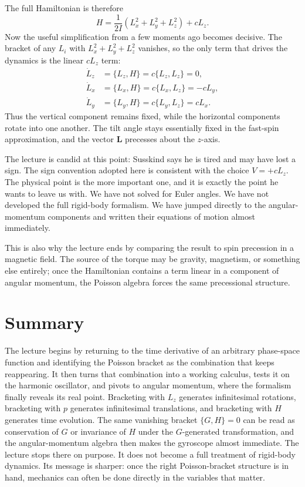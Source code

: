 The full Hamiltonian is therefore
\begin{equation}
H=\frac{1}{2I}\left(L_x^2+L_y^2+L_z^2\right)+cL_z.
\end{equation}
Now the useful simplification from a few moments ago becomes decisive. The bracket of any \(L_i\) with \(L_x^2+L_y^2+L_z^2\) vanishes, so the only term that drives the dynamics is the linear \(cL_z\) term:
\begin{align}
\dot L_z&=\{L_z,H\}=c\{L_z,L_z\}=0,\\
\dot L_x&=\{L_x,H\}=c\{L_x,L_z\}=-cL_y,\\
\dot L_y&=\{L_y,H\}=c\{L_y,L_z\}=cL_x.
\end{align}
Thus the vertical component remains fixed, while the horizontal components rotate into one another. The tilt angle stays essentially fixed in the fast-spin approximation, and the vector \(\mathbf L\) precesses about the \(z\)-axis.

The lecture is candid at this point: Susskind says he is tired and may have lost a sign. The sign convention adopted here is consistent with the choice \(V=+cL_z\). The physical point is the more important one, and it is exactly the point he wants to leave us with. We have not solved for Euler angles. We have not developed the full rigid-body formalism. We have jumped directly to the angular-momentum components and written their equations of motion almost immediately.

This is also why the lecture ends by comparing the result to spin precession in a magnetic field. The source of the torque may be gravity, magnetism, or something else entirely; once the Hamiltonian contains a term linear in a component of angular momentum, the Poisson algebra forces the same precessional structure.

\section{Summary}

The lecture begins by returning to the time derivative of an arbitrary phase-space function and identifying the Poisson bracket as the combination that keeps reappearing. It then turns that combination into a working calculus, tests it on the harmonic oscillator, and pivots to angular momentum, where the formalism finally reveals its real point. Bracketing with \(L_z\) generates infinitesimal rotations, bracketing with \(p\) generates infinitesimal translations, and bracketing with \(H\) generates time evolution. The same vanishing bracket \(\{G,H\}=0\) can be read as conservation of \(G\) or invariance of \(H\) under the \(G\)-generated transformation, and the angular-momentum algebra then makes the gyroscope almost immediate. The lecture stops there on purpose. It does not become a full treatment of rigid-body dynamics. Its message is sharper: once the right Poisson-bracket structure is in hand, mechanics can often be done directly in the variables that matter.